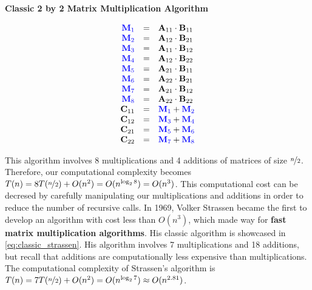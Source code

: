     \begin{center}
        \textbf{Classic 2 by 2 Matrix Multiplication Algorithm}
        \vspace{-20pt}
    \end{center}
    \begin{equation}
        \begin{array}{rcl}
            \color{blue} \mathbf{M}_1 & = & \mathbf{A}_{11}\cdot \mathbf{B}_{11} \\
            \color{blue} \mathbf{M}_2 & = & \mathbf{A}_{12}\cdot \mathbf{B}_{21} \\
            \color{blue} \mathbf{M}_3 & = & \mathbf{A}_{11}\cdot \mathbf{B}_{12} \\
            \color{blue} \mathbf{M}_4 & = & \mathbf{A}_{12}\cdot \mathbf{B}_{22} \\
            \color{blue} \mathbf{M}_5 & = & \mathbf{A}_{21}\cdot \mathbf{B}_{11} \\
            \color{blue} \mathbf{M}_6 & = & \mathbf{A}_{22}\cdot \mathbf{B}_{21} \\
            \color{blue} \mathbf{M}_7 & = & \mathbf{A}_{21}\cdot \mathbf{B}_{12} \\
            \color{blue} \mathbf{M}_8 & = & \mathbf{A}_{22}\cdot \mathbf{B}_{22} \\
            \mathbf{C}_{11} & = & \color{blue} \mathbf{M}_1 \color{black} + \color{blue} \mathbf{M}_2 \\
            \mathbf{C}_{12} & = & \color{blue} \mathbf{M}_3 \color{black} + \color{blue} \mathbf{M}_4 \\
            \mathbf{C}_{21} & = & \color{blue} \mathbf{M}_5 \color{black} + \color{blue} \mathbf{M}_6 \\
            \mathbf{C}_{22} & = & \color{blue} \mathbf{M}_7 \color{black} + \color{blue} \mathbf{M}_8
        \end{array}
        \label{eq:classic_matmul}
    \end{equation}


    This algorithm involves 8 multiplications and 4 additions of matrices of size
    $\nicefrac n2$. Therefore, our computational complexity becomes $T(n) =
    8T(\nicefrac{n}{2}) + O(n^2) = O(n^{\log_2 8}) = O(n^3)$. This computational
    cost can be decresed by carefully manipulating our multiplications and additions
    in order to reduce the number of recursive calls. In 1969, Volker Strassen
    became the first to develop an algorithm with cost less than $O(n^3)$, which
    made way for \textbf{fast matrix multiplication algorithms}. His classic
    algorithm is showcased in \ref{eq:classic_strassen}. His algorithm involves 7
    multiplications and 18 additions, but recall that additions are computationally
    less expensive than multiplications. The computational complexity of Strassen's
    algorithm is $T(n) = 7T(\nicefrac n2) + O(n^2) = O(n^{\log_2 7}) \approx O(n^{2.81})$. 

